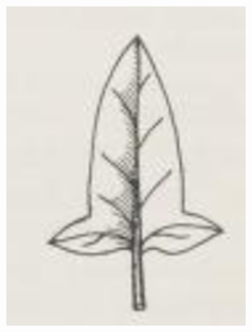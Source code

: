 \documentclass[12pt,english]{article}
\begin{document}
\begin{figure}[!hbt]
\begin{centre}
\begin{minipage}{0.19\textwidth}
		\includegraphics[width=\textwidth]{../code/contour/original/hastate}
	\end{minipage}
\end{centre}
\end{figure}
\end{document}
